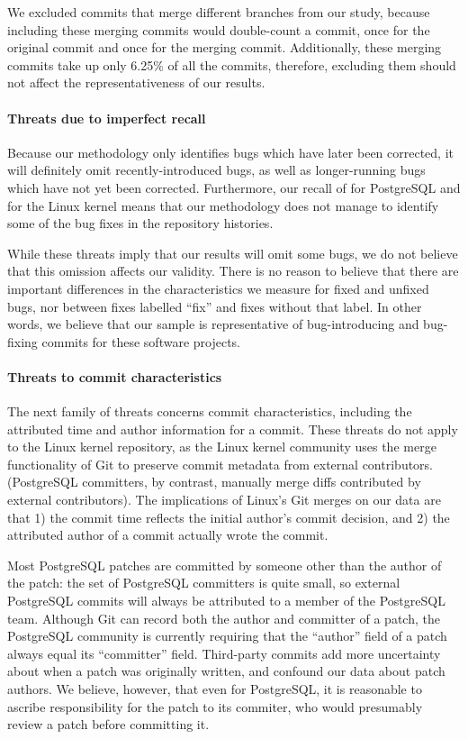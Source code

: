 We excluded commits that merge different branches from our study, because
including these merging commits would double-count a commit, once
for the original commit and once for the merging commit. 
Additionally, these merging commits take up only 6.25\% of all the commits,
therefore, excluding them should not affect the representativeness of our results. 

\newpage
\paragraph{Threats due to imperfect recall}
Because our methodology only identifies bugs which have later been
corrected, it will definitely omit recently-introduced bugs, as well
as longer-running bugs which have not yet been corrected. Furthermore,
our recall of \postR for PostgreSQL and \linuxR for the Linux kernel means
that our methodology does not manage to identify some of the bug fixes
in the repository histories.

While these threats imply that our results will omit some bugs, we do
not believe that this omission affects our validity. There is no
reason to believe that there are important differences in the
characteristics we measure for fixed and unfixed bugs, nor between
fixes labelled ``fix'' and fixes without that label. In other words,
we believe that our sample is representative of bug-introducing and
bug-fixing commits for these software projects.

\paragraph{Threats to commit characteristics}
The next family of threats concerns commit characteristics,
including the attributed time and author information for a commit.
These threats do not apply to the Linux kernel repository, as the Linux
kernel community uses the merge functionality of Git to preserve
commit metadata from external contributors. (PostgreSQL committers, by
contrast, manually merge diffs contributed by external contributors).
The implications of Linux's Git merges on our data are that 1) the commit
time reflects the initial author's commit decision, and 2) the
attributed author of a commit actually wrote the commit.

Most PostgreSQL patches are committed by someone other than the author
of the patch: the set of PostgreSQL committers is quite small, so
external PostgreSQL commits will always be attributed to a member of the
PostgreSQL team. Although Git can record both the author and committer
of a patch, the PostgreSQL community is currently requiring that the
``author'' field of a patch always equal its ``committer'' field.
Third-party commits add more uncertainty about when a patch was
originally written, and confound our data about patch authors.  We
believe, however, that even for PostgreSQL, it is reasonable to ascribe
responsibility for the patch to its commiter, who would presumably
review a patch before committing it. 


